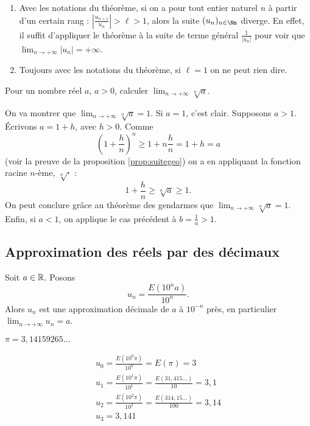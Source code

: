 \documentclass[class=report,crop=false]{standalone}
\begin{document}
\begin{remarque*}
\sauteligne
  \begin{enumerate}
    \item Avec les notations du théorème, si on a pour tout entier naturel $n$
à partir d'un certain rang : $\left|\frac{u_{n+1}}{u_n}\right|>\ell>1$, alors la suite $(u_n)_{n\in \Nn}$ diverge. En effet, il suffit d'appliquer le théorème à la suite de terme général $ \frac{1}{\lvert u_n \rvert }$ pour voir que  $\lim_{n\to +\infty} \lvert u_n \rvert =+\infty$.
    \item Toujours avec les notations du théorème, si $\ell=1$ on ne peut rien dire.
  \end{enumerate}
\end{remarque*}

\begin{exemple}
Pour un nombre réel $a$, $a>0$, calculer $\lim_{n\to +\infty} \sqrt[n]{a}$.

On va montrer que $\lim_{n\to +\infty} \sqrt[n]{a}=1$. Si $a=1$, c'est clair.
Supposons $a>1$. Écrivons $a=1+h$, avec $h>0$. Comme
\[\left(1+\frac{h}{n}\right)^n\geq 1+n\frac{h}{n}=1+h=a\]
(voir la preuve de la proposition \ref{prop:suitegeo}) on a en appliquant la fonction racine $n$-ème, $\sqrt[n]{\cdot}$ :
\[ 1+\frac{h}{n} \geq \sqrt[n]{a} \geq 1 .\]
On peut conclure grâce au théorème \og des gendarmes \fg{} que $\lim_{n\to +\infty} \sqrt[n]{a}=1$.
Enfin, si $a<1$, on applique le cas précédent à $b= \frac{1}{a}>1$.
\end{exemple}






\subsection{Approximation des réels par des décimaux}

\begin{proposition}
\label{prop:ecdecim}
  Soit $a\in \mathbb{R}$. Posons
  \[u_n = \frac{E(10^na)}{10^n}. \]
  Alors $u_n$ est une approximation décimale de $a$ à $10^{-n}$ près,
  en particulier $\lim_{n\to +\infty} u_n=a$.
\end{proposition}

\begin{exemple} $\pi= 3,14159265\ldots$

 $$ \begin{array}{l}
    u_0  = \frac{E(10^0\pi)}{10^0}  = E(\pi)  = 3\\
    u_1  = \frac{E(10^1\pi)}{10^1}  = \frac{E(31,415\ldots)}{10}  = 3,1\\
    u_2  = \frac{E(10^2\pi)}{10^2}  = \frac{E(314,15\ldots)}{100} = 3,14\\
    u_3  = 3,141
  \end{array}$$
\end{exemple}
\end{document}
